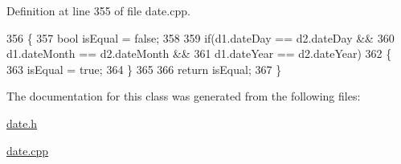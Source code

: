 Definition at line 355 of file date.\+cpp.


\begin{DoxyCode}
356 \{
357     \textcolor{keywordtype}{bool} isEqual = \textcolor{keyword}{false};
358 
359     \textcolor{keywordflow}{if}(d1.dateDay == d2.dateDay &&
360             d1.dateMonth == d2.dateMonth &&
361             d1.dateYear == d2.dateYear)
362     \{
363         isEqual = \textcolor{keyword}{true};
364     \}
365 
366     \textcolor{keywordflow}{return} isEqual;
367 \}
\end{DoxyCode}


The documentation for this class was generated from the following files\+:\begin{DoxyCompactItemize}
\item 
\hyperlink{date_8h}{date.\+h}\item 
\hyperlink{date_8cpp}{date.\+cpp}\end{DoxyCompactItemize}
